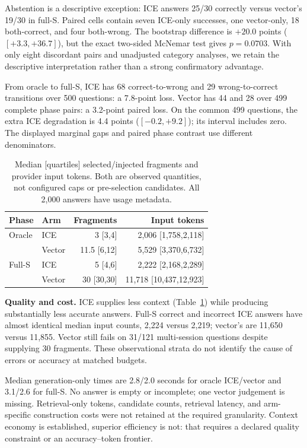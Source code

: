 \documentclass[11pt]{article}
\begin{document}
Abstention is a descriptive exception: ICE answers 25/30 correctly versus vector's 19/30 in full-S. Paired cells contain seven ICE-only successes, one vector-only, 18 both-correct, and four both-wrong. The bootstrap difference is $+20.0$ points ($[+3.3,+36.7]$), but the exact two-sided McNemar test gives $p=0.0703$. With only eight discordant pairs and unadjusted category analyses, we retain the descriptive interpretation rather than a strong confirmatory advantage.

From oracle to full-S, ICE has 68 correct-to-wrong and 29 wrong-to-correct transitions over 500 questions: a 7.8-point loss. Vector has 44 and 28 over 499 complete phase pairs: a 3.2-point paired loss. On the common 499 questions, the extra ICE degradation is 4.4 points ($[-0.2,+9.2]$); its interval includes zero. The displayed marginal gaps and paired phase contrast use different denominators.

\begin{table}[t]
\centering\small
\begin{tabular}{@{}llrr@{}}\toprule
Phase & Arm & Fragments & Input tokens\\\midrule
Oracle & ICE & 3 [3,4] & 2,006 [1,758,2,118]\\
 & Vector & 11.5 [6,12] & 5,529 [3,370,6,732]\\
Full-S & ICE & 5 [4,6] & 2,222 [2,168,2,289]\\
 & Vector & 30 [30,30] & 11,718 [10,437,12,923]\\\bottomrule
\end{tabular}
\caption{Median [quartiles] selected/injected fragments and provider input tokens. Both are observed quantities, not configured caps or pre-selection candidates. All 2,000 answers have usage metadata.}
\label{tab:cost}
\end{table}

\textbf{Quality and cost.} ICE supplies less context (Table~\ref{tab:cost}) while producing substantially less accurate answers. Full-S correct and incorrect ICE answers have almost identical median input counts, 2,224 versus 2,219; vector's are 11,650 versus 11,855. Vector still fails on 31/121 multi-session questions despite supplying 30 fragments. These observational strata do not identify the cause of errors or accuracy at matched budgets.

Median generation-only times are 2.8/2.0 seconds for oracle ICE/vector and 3.1/2.6 for full-S. No answer is empty or incomplete; one vector judgement is missing. Retrieval-only tokens, candidate counts, retrieval latency, and arm-specific construction costs were not retained at the required granularity. Context economy is established, superior efficiency is not: that requires a declared quality constraint or an accuracy--token frontier.
\end{document}
